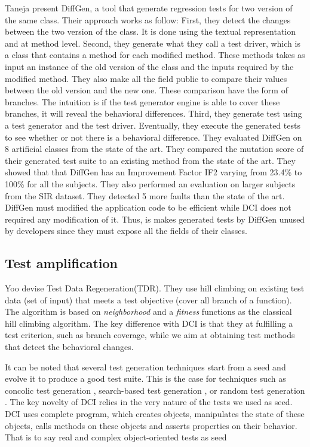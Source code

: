 Taneja \etal \cite{Taneja:2008:DAR:1642931.1642986} present DiffGen, a tool that generate regression tests for two version of the same class.
Their approach works as follow:
First, they detect the changes between the two version of the class.
It is done using the textual representation and at method level.
Second, they generate what they call a test driver, which is a class that contains a method for each modified method.
These methods takes as input an instance of the old version of the class and the inputs required by the modified method.
They also make all the field public to compare their values between the old version and the new one.
These comparison have the form of branches.
The intuition is if the test generator engine is able to cover these branches, it will reveal the behavioral differences.
Third, they generate test using a test generator and the test driver.
Eventually, they execute the generated tests to see whether or not there is a behavioral difference.
They evaluated DiffGen on 8 artificial classes from the state of the art.
They compared the mutation score of their generated test suite to an existing method from the state of the art.
They showed that that DiffGen has an Improvement Factor IF2 varying from 23.4\% to 100\% for all the subjects.
They also performed an evaluation on larger subjects from the SIR dataset.
They detected 5 more faults than the state of the art.
DiffGen must modified the application code to be efficient while DCI does not required any modification of it.
Thus, is makes generated tests by DiffGen unused by developers since they must expose all the fields of their classes.

\subsection{Test amplification}

Yoo \etal \cite{Yoo:2012:TDR:2237756.2237758} devise Test Data Regeneration(TDR). They use hill climbing on existing test data (set of input) that meets a test objective (\eg cover all branch of a function).
The algorithm is based on \emph{neighborhood} and a \emph{fitness} functions as the classical hill climbing algorithm.
The key difference with DCI is that they at fulfilling a test criterion, such as branch coverage, while we aim at obtaining test methods that detect the behavioral changes.

It can be noted that several test generation techniques start from a seed and evolve it to produce a good test suite. This is the case for techniques such as concolic test generation \cite{godefroid2005dart}, search-based test generation \cite{fraser2012seed}, or random  test generation \cite{groce2007randomized}.
The key novelty of DCI relies in the very nature of the tests we used as seed.
DCI uses complete program, which creates objects, manipulates the state of these objects, calls methods on these objects and asserts properties on their behavior. That is to say real and complex object-oriented tests as seed


